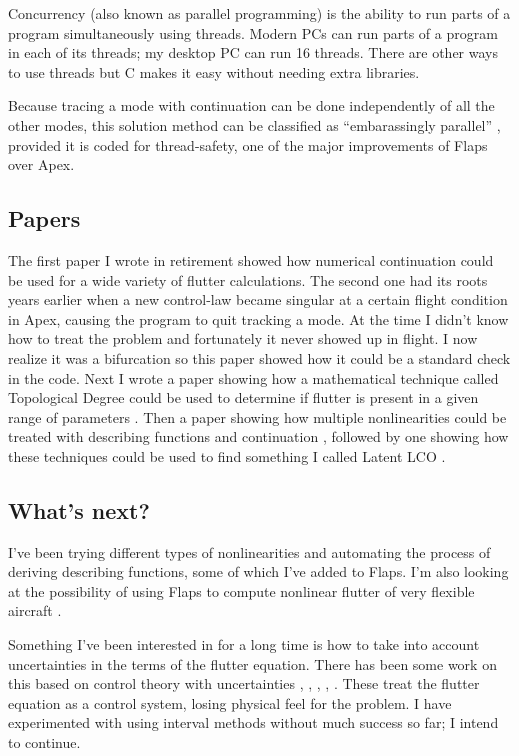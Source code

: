 \documentclass[11pt,openany,twoside]{book}
\numberwithin{equation}{section}		%
\def\Cpp{{C\nolinebreak[4]\hspace{-.05em}\raisebox{.4ex}{\tiny\bf ++}}\:}
\begin{document}
Concurrency (also known as parallel programming) is the ability to run
parts of a program simultaneously using threads. Modern PCs can run
parts of a program in each of its threads; my desktop PC can run 16
threads. There are other ways to use threads but \Cpp -11 makes it easy
without needing extra libraries.

Because tracing a mode with continuation can be done independently of
all the other modes, this solution method can be classified as
``embarassingly parallel'' \cite{williams2009c++}, provided it is coded
for thread-safety, one of the major improvements of Flaps over Apex.

\subsection{Papers}
The first paper I wrote in retirement \cite{meyer2014unified} showed how
numerical continuation could be used for a wide variety of flutter
calculations. The second one \cite{meyer2015continuation}
had its roots years earlier when a new control-law became singular
at a certain flight condition
in Apex, causing the program to quit tracking a mode.
At the time I didn't know how to treat the problem and fortunately it
never showed up in flight. I now realize it was a bifurcation so this
paper showed how it could be a standard check in the code.
Next I wrote a paper showing how a mathematical technique called
Topological Degree could be used to determine if flutter is present
in a given range of parameters \cite{meyer2015topological}.
Then a paper showing how multiple nonlinearities could be treated with
describing functions and continuation \cite{meyer2016continuation},
followed by one showing how these techniques could be used to find
something I called Latent LCO \cite{meyer2021latent}.


\subsection{What's next?}
I've been trying different types of nonlinearities and automating
the process of deriving describing functions, some of which I've added
to Flaps. I'm  also looking at the possibility of using Flaps to
compute nonlinear flutter of very flexible aircraft \cite{patil2001limit}.

Something I've been interested in for a long time is how to
take into account uncertainties in the terms of the flutter equation.
There has been some work on this based on control theory with uncertainties
\cite{danowsky2010evaluation}, \cite{iannelli2017nonlinear}, \cite{dai2014methods},
\cite{bueno2015flutter},
\cite{borglund2004mu}.
These treat the flutter equation as a control system, losing physical
feel for the problem. I have experimented with using interval methods
\cite{neumaier1990interval} without much success so far; I intend to
continue.
\end{document}
